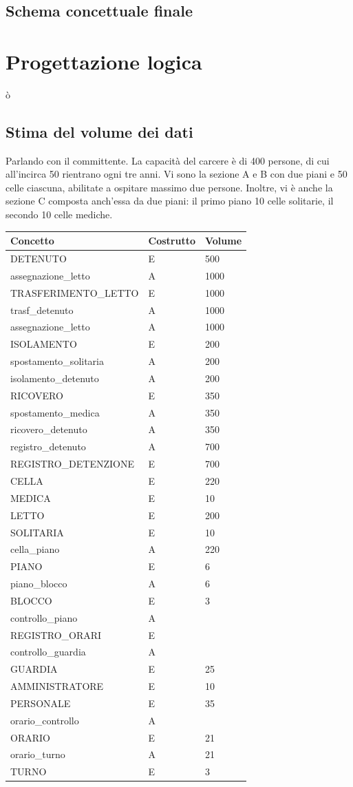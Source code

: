\documentclass[a4paper,12pt]{report}
\begin{document}
\section{Schema concettuale finale}
\chapter{Progettazione logica}ò
\section{Stima del volume dei dati}
Parlando con il committente.
%
La capacità del carcere è di 400 persone, di cui all'incirca 50 rientrano ogni tre anni.
%
Vi sono la sezione A e B con due piani e 50 celle ciascuna, abilitate a ospitare massimo due persone.
%
Inoltre, vi è anche la sezione C composta anch'essa da due piani: il primo piano 10 celle solitarie, il secondo 10 celle mediche.
%


\begin{table}[H]
\begin{tabular}{lll}
\hline
Concetto & Costrutto & Volume \\ \hline
DETENUTO & E & 500 \\
assegnazione\_letto & A &  1000 \\
TRASFERIMENTO\_LETTO & E &  1000 \\
trasf\_detenuto & A & 1000 \\
assegnazione\_letto & A & 1000 \\
ISOLAMENTO & E & 200\\
spostamento\_solitaria & A & 200\\
isolamento\_detenuto & A & 200 \\
RICOVERO & E & 350 \\
spostamento\_medica & A & 350 \\
ricovero\_detenuto & A & 350 \\
registro\_detenuto & A & 700 \\
REGISTRO\_DETENZIONE & E & 700 \\
CELLA & E & 220 \\
MEDICA & E & 10\\
LETTO & E & 200 \\
SOLITARIA & E & 10 \\
cella\_piano & A & 220 \\
PIANO & E & 6 \\
piano\_blocco & A & 6 \\
BLOCCO & E & 3 \\
controllo\_piano & A & \\
REGISTRO\_ORARI & E & \\
controllo\_guardia & A & \\
GUARDIA & E & 25 \\
AMMINISTRATORE & E & 10 \\
PERSONALE & E & 35 \\
orario\_controllo & A & \\
ORARIO & E & 21 \\
orario\_turno & A & 21 \\
TURNO & E & 3 \\
\end{tabular}
\end{table}
\end{document}
